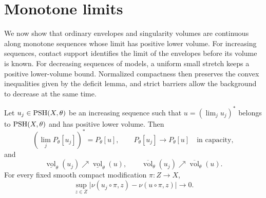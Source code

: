 \section{Monotone limits}
\label{sec:mass-bound-monotone-limits}

We now show that ordinary envelopes and singularity volumes are continuous along monotone sequences whose limit has positive lower volume. For increasing sequences, contact support identifies the limit of the envelopes before its volume is known. For decreasing sequences of models, a uniform small stretch keeps a positive lower-volume bound. Normalized compactness then preserves the convex inequalities given by the deficit lemma, and strict barriers allow the background to decrease at the same time.

\begin{theorem}\label{thm:increasing-envelope-volume-continuity}
Let $u_j\in\mathrm{PSH}(X,\theta)$ be an increasing sequence such that $u=(\lim_j u_j)^*$ belongs to $\mathrm{PSH}(X,\theta)$ and has positive lower volume. Then
\[
 \left(\lim_jP_\theta[u_j]\right)^*=P_\theta[u],
 \qquad P_\theta[u_j]\longrightarrow P_\theta[u]
       \quad\text{in capacity},
\]
and
\[
 \underline{\operatorname{vol}}_\theta(u_j)\nearrow
       \underline{\operatorname{vol}}_\theta(u),\qquad
 \overline{\operatorname{vol}}_\theta(u_j)\nearrow
       \overline{\operatorname{vol}}_\theta(u).
\]
For every fixed smooth compact modification $\pi\colon Z\to X$,
\[
 \sup_{z\in Z}\bigl|\nu(u_j\circ\pi,z)-\nu(u\circ\pi,z)\bigr|
       \longrightarrow0.
\]
\end{theorem}

